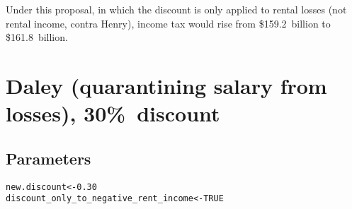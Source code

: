 \documentclass{grattan}\usepackage[]{graphicx}\usepackage[]{color}
\makeatletter
\newcommand{\hlnum}[1]{\textcolor[rgb]{0.686,0.059,0.569}{#1}}%
\newcommand{\hlstd}[1]{\textcolor[rgb]{0.345,0.345,0.345}{#1}}%
\newcommand{\hlkwb}[1]{\textcolor[rgb]{0.69,0.353,0.396}{#1}}%
\newenvironment{kframe}{%
 \def\at@end@of@kframe{}%
 \ifinner\ifhmode%
  \def\at@end@of@kframe{\end{minipage}}%
  \begin{minipage}{\columnwidth}%
 \fi\fi%
 \def\FrameCommand##1{\hskip\@totalleftmargin \hskip-\fboxsep
 \colorbox{shadecolor}{##1}\hskip-\fboxsep
     \hskip-\linewidth \hskip-\@totalleftmargin \hskip\columnwidth}%
 \MakeFramed {\advance\hsize-\width
   \@totalleftmargin\z@ \linewidth\hsize
   \@setminipage}}%
 {\par\unskip\endMakeFramed%
 \at@end@of@kframe}
\newenvironment{knitrout}{}{} %
\makeatother
\begin{document}
Under this proposal, in which the discount is only applied to rental losses (not rental income, contra Henry), income tax would rise from \$159.2~billion to \$161.8~billion.

\section{Daley (quarantining salary from losses), 30\%\ discount}
\subsection{Parameters}
\begin{knitrout}
\color{fgcolor}\begin{kframe}
\begin{alltt}
\hlstd{new.discount} \hlkwb{<-} \hlnum{0.30}
\hlstd{discount_only_to_negative_rent_income} \hlkwb{<-} \hlnum{TRUE}
\end{alltt}
\end{kframe}
\end{knitrout}
\end{document}
